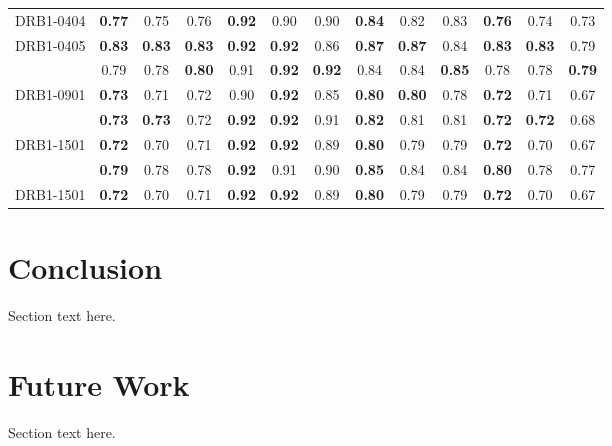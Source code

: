 \documentclass[conference,10pt,draftclsnofoot,onecolumn]{IEEEtran}
\begin{document}
\begin{table}[!t]
\begin{tabular}{|c|c|c|c|c|c|c|c|c|c|c|c|c|}
\multirow{1}{*}{DRB1-0404}  & \bf 0.77 & 0.75 & 0.76 & \bf 0.92 & 0.90 & 0.90 & \bf 0.84 & 0.82 & 0.83 & \bf 0.76 & 0.74 & 0.73\\
\cline{2-13}
DRB1-0405 & \bf 0.83 & \bf 0.83 & \bf 0.83 & \bf 0.92 & \bf 0.92 & 0.86 & \bf 0.87 & \bf 0.87 & 0.84 & \bf 0.83 & \bf 0.83 & 0.79\\
\hhline{=============}

\multirow{1}{*}{DRB1-0701} & 0.79 & 0.78 & \bf 0.80 & 0.91 & \bf 0.92 & \bf 0.92 & 0.84 & 0.84 & \bf 0.85 & 0.78 & 0.78 & \bf0.79\\
\cline{2-13}
DRB1-0901 & \bf 0.73 & 0.71 & 0.72 & 0.90 & \bf 0.92 & 0.85 & \bf 0.80 & \bf 0.80 & 0.78 & \bf 0.72 & 0.71 & 0.67\\
\hhline{=============}

\multirow{1}{*}{DRB1-0401} & \bf 0.73 & \bf 0.73 & 0.72 & \bf 0.92 & \bf 0.92 & 0.91 & \bf 0.82 & 0.81 & 0.81 & \bf 0.72 & \bf 0.72 & 0.68\\
\cline{2-13}
DRB1-1501 & \bf 0.72 & 0.70 & 0.71 & \bf 0.92 & \bf 0.92 & 0.89 & \bf 0.80 & 0.79 & 0.79 & \bf 0.72 & 0.70 & 0.67\\
\hhline{=============}

\multirow{1}{*}{DRB1-1101} & \bf 0.79 & 0.78 & 0.78 & \bf 0.92 & 0.91 & 0.90 & \bf 0.85 & 0.84 & 0.84 & \bf 0.80 & 0.78 & 0.77\\
\cline{2-13}
DRB1-1501 & \bf 0.72 & 0.70 & 0.71 & \bf 0.92 & \bf 0.92 & 0.89 & \bf 0.80 & 0.79 & 0.79 & \bf 0.72 & 0.70 & 0.67\\
\hline
\end{tabular}
\end{table}


\section{Conclusion}
\label{sec:conclusion}
Section text here.

\section{Future Work}
\label{sec:futureWork}
Section text here.
\end{document}
